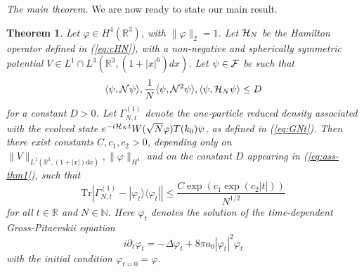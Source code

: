 \documentclass[11pt,a4paper]{article}
\newtheorem{thm}{Theorem}[section]  %
\newcommand{\bR}{{\mathbb R}}
\newcommand{\bN}{{\mathbb N}}
\newcommand{\tr}{\mbox{Tr}}
\newcommand{\cF}{{\cal F}}
\newcommand{\cH}{{\cal H}}
\newcommand{\cN}{{\cal N}}
\begin{document}
\bigskip

{\it The main theorem.} We are now ready to state our main result. 
\begin{thm}\label{thm:main}
Let $\varphi \in H^4 (\bR^3)$, with $\| \varphi \|_2 =1$. Let $\cH_N$ be the
Hamilton operator defined in (\ref{eq:cHN}), with a non-negative and
spherically symmetric potential $V \in L^1\cap L^3 (\bR^3, (1+|x|^6) dx)$. Let $\psi \in \cF$ be such that
\begin{equation}\label{eq:ass-thm1} \langle \psi , \cN \psi \rangle ,  \frac{1}{N} \langle \psi , \cN^2 \psi \rangle, \langle \psi, \cH_N \psi \rangle \leq D \end{equation}
for a constant $D>0$. Let $\Gamma_{N,t}^{(1)}$ denote the one-particle reduced density associated with the evolved state $e^{-i\cH_N t} W(\sqrt{N} \varphi) T(k_0) \psi$, as defined in (\ref{eq:GNt}). Then there exist constants $C, c_1, c_2 >0$, depending only on $\| V \|_{L^1 (\bR^3, (1+|x|) dx)}, \| \varphi \|_{H^4}$ and on the constant $D$ appearing in (\ref{eq:ass-thm1}), such that
\begin{equation}\label{eq:mt} \tr \left| \Gamma_{N,t}^{(1)} - |\varphi_t\rangle \langle \varphi_t| \right| \leq \frac{C \exp (c_1 \exp (c_2 |t|))}{N^{1/2}} \end{equation}
for all $t \in \bR$ and $N \in \bN$. Here $\varphi_t$ denotes the solution of the time-dependent Gross-Pitaevskii equation
\begin{equation}\label{eq:GP} i\partial_t \varphi_t = -\Delta \varphi_t + 8 \pi a_0 |\varphi_t|^2 \varphi_t \end{equation}
with the initial condition $\varphi_{t=0} =\varphi$.
\end{thm}
\end{document}
